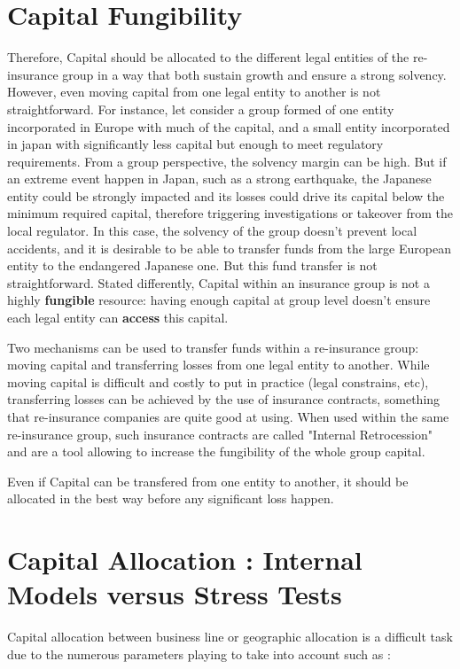 \section{Capital Fungibility}

Therefore, Capital should be allocated to the different legal entities of the re-insurance group in a way that both sustain growth and ensure a strong solvency. However, even moving capital from one legal entity to another is not straightforward. For instance, let consider a group formed of one entity incorporated in Europe with much of the capital, and a small entity incorporated in japan with significantly less capital but enough to meet regulatory requirements. From a group perspective, the solvency margin can be high. But if an extreme event happen in Japan, such as a strong earthquake, the Japanese entity could be strongly impacted and its losses could drive its capital below the minimum required capital, therefore triggering investigations or takeover from the local regulator. In this case, the solvency of the group doesn't prevent local accidents, and it is desirable to be able to transfer funds from the large European entity to the endangered Japanese one. But this fund transfer is not straightforward. Stated differently, Capital within an insurance group is not a highly \textbf{fungible} resource: having enough capital at group level doesn't ensure each legal entity can \textbf{access} this capital.

Two mechanisms can be used to transfer funds within a re-insurance group: moving capital and transferring losses from one legal entity to another. While moving capital is difficult and costly to put in practice (legal constrains, etc), transferring losses can be achieved by the use of insurance contracts, something that re-insurance companies are quite good at using. When used within the same re-insurance group, such insurance contracts are called "Internal Retrocession" and are a tool allowing to increase the fungibility of the whole group capital. 

Even if Capital can be transfered from one entity to another, it should be allocated in the best way before any significant loss happen. 

\section{Capital Allocation : Internal Models versus Stress Tests}

Capital allocation between business line or geographic allocation is a difficult task due to the numerous parameters playing to take into account such as :

